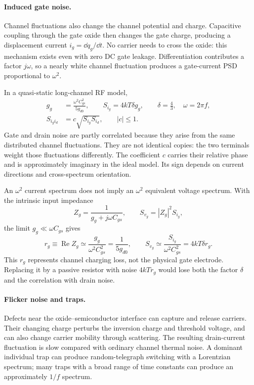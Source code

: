 \paragraph{Induced gate noise.}
Channel fluctuations also change the channel potential and charge. Capacitive coupling through the gate oxide then changes the gate charge, producing a displacement current $i_g=\dd q_g/\dd t$. No carrier needs to cross the oxide: this mechanism exists even with zero DC gate leakage. Differentiation contributes a factor $j\omega$, so a nearly white channel fluctuation produces a gate-current PSD proportional to $\omega^2$.

In a quasi-static long-channel RF model,
\begin{align}
g_g&=\frac{\omega^2C_{gs}^2}{5g_{d0}},\qquad
S_{i_g}=4kT\delta g_g,\qquad \delta=\frac43,\quad \omega=2\pi f,\\
S_{i_g i_d}&=c\sqrt{S_{i_g}S_{i_d}},\qquad |c|\leq1.
\end{align}
Gate and drain noise are partly correlated because they arise from the same distributed channel fluctuations. They are not identical copies: the two terminals weight those fluctuations differently. The coefficient $c$ carries their relative phase and is approximately imaginary in the ideal model. Its sign depends on current directions and cross-spectrum orientation.

An $\omega^2$ current spectrum does not imply an $\omega^2$ equivalent voltage spectrum. With the intrinsic input impedance
\[
Z_g=\frac1{g_g+j\omega C_{gs}},\qquad
S_{v_g}=|Z_g|^2S_{i_g},
\]
the limit $g_g\ll\omega C_{gs}$ gives
\[
r_g\equiv\operatorname{Re}Z_g\simeq\frac{g_g}{\omega^2C_{gs}^2}
=\frac1{5g_{d0}},\qquad
S_{v_g}\simeq\frac{S_{i_g}}{\omega^2C_{gs}^2}=4kT\delta r_g.
\]
This $r_g$ represents channel charging loss, not the physical gate electrode. Replacing it by a passive resistor with noise $4kTr_g$ would lose both the factor $\delta$ and the correlation with drain noise.

\paragraph{Flicker noise and traps.}
Defects near the oxide--semiconductor interface can capture and release carriers. Their changing charge perturbs the inversion charge and threshold voltage, and can also change carrier mobility through scattering. The resulting drain-current fluctuation is slow compared with ordinary channel thermal noise. A dominant individual trap can produce random-telegraph switching with a Lorentzian spectrum; many traps with a broad range of time constants can produce an approximately $1/f$ spectrum.

